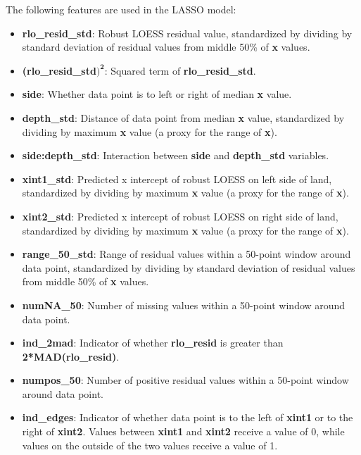 \documentclass[12pt]{article}
\begin{document}
The following features are used in the LASSO model:

\begin{itemize}

\item[] \textbf{rlo\_resid\_std}: Robust LOESS residual value, standardized by dividing by standard deviation of residual values from middle 50\% of \textbf{x} values.  

\item[] \textbf{(rlo\_resid\_std$\mathbf{)^2}$}: Squared term of \textbf{rlo\_resid\_std}.  

\item[] \textbf{side}: Whether data point is to left or right of median \textbf{x} value.  

\item[] \textbf{depth\_std}: Distance of data point from median \textbf{x} value, standardized by dividing by maximum \textbf{x} value (a proxy for the range of \textbf{x}).  

\item[] \textbf{side:depth\_std}: Interaction between \textbf{side} and \textbf{depth\_std} variables.  

\item[] \textbf{xint1\_std}: Predicted x intercept of robust LOESS on left side of land, standardized by dividing by maximum \textbf{x} value (a proxy for the range of \textbf{x}).  

\item[] \textbf{xint2\_std}: Predicted x intercept of robust LOESS on right side of land, standardized by dividing by maximum \textbf{x} value (a proxy for the range of \textbf{x}).  

\item[] \textbf{range\_50\_std}: Range of residual values within a 50-point window around data point, standardized by dividing by standard deviation of residual values from middle 50\% of \textbf{x} values.  

\item[] \textbf{numNA\_50}: Number of missing values within a 50-point window around data point.  

\item[] \textbf{ind\_2mad}: Indicator of whether \textbf{rlo\_resid} is greater than \textbf{2*MAD(rlo\_resid)}.  

\item[] \textbf{numpos\_50}: Number of positive residual values within a 50-point window around data point.  

\item[] \textbf{ind\_edges}: Indicator of whether data point is to the left of \textbf{xint1} or to the right of \textbf{xint2}. Values between \textbf{xint1} and \textbf{xint2} receive a value of 0, while values on the outside of the two values receive a value of 1.  

\end{itemize}
\end{document}

